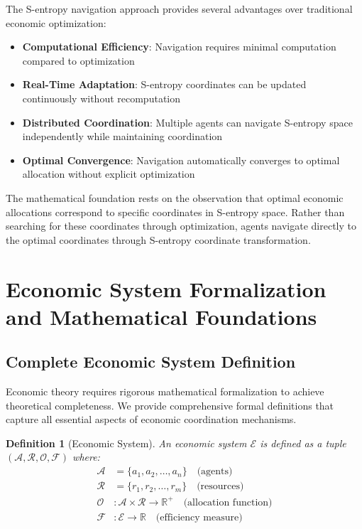 \documentclass[12pt,a4paper]{article}
\newtheorem{definition}[theorem]{Definition}
\begin{document}
The S-entropy navigation approach provides several advantages over traditional economic optimization:
\begin{itemize}
\item \textbf{Computational Efficiency}: Navigation requires minimal computation compared to optimization
\item \textbf{Real-Time Adaptation}: S-entropy coordinates can be updated continuously without recomputation
\item \textbf{Distributed Coordination}: Multiple agents can navigate S-entropy space independently while maintaining coordination
\item \textbf{Optimal Convergence}: Navigation automatically converges to optimal allocation without explicit optimization
\end{itemize}

The mathematical foundation rests on the observation that optimal economic allocations correspond to specific coordinates in S-entropy space. Rather than searching for these coordinates through optimization, agents navigate directly to the optimal coordinates through S-entropy coordinate transformation.

\section{Economic System Formalization and Mathematical Foundations}

\subsection{Complete Economic System Definition}

Economic theory requires rigorous mathematical formalization to achieve theoretical completeness. We provide comprehensive formal definitions that capture all essential aspects of economic coordination mechanisms.

\begin{definition}[Economic System]
An economic system $\mathcal{E}$ is defined as a tuple $(\mathcal{A}, \mathcal{R}, \mathcal{O}, \mathcal{F})$ where:
\begin{align}
\mathcal{A} &= \{a_1, a_2, \ldots, a_n\} \quad \text{(agents)} \\
\mathcal{R} &= \{r_1, r_2, \ldots, r_m\} \quad \text{(resources)} \\
\mathcal{O} &: \mathcal{A} \times \mathcal{R} \to \mathbb{R}^+ \quad \text{(allocation function)} \\
\mathcal{F} &: \mathcal{E} \to \mathbb{R} \quad \text{(efficiency measure)}
\end{align}
\end{definition}
\end{document}
